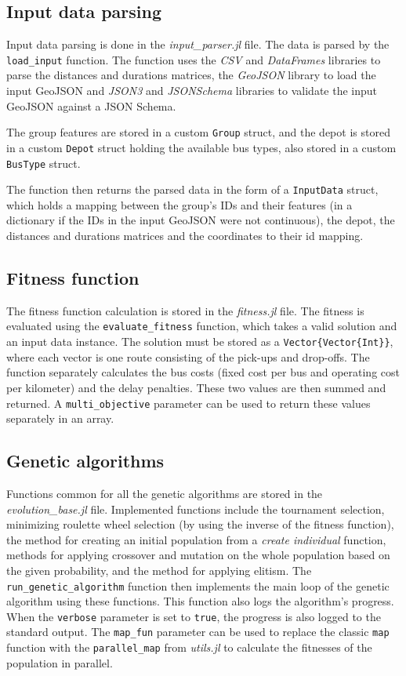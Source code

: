 \subsection{Input data parsing}

Input data parsing is done in the \textit{input\_parser.jl} file. The data is parsed by the \texttt{load\_input} function. The function uses the \textit{CSV} and \textit{DataFrames} libraries to parse the distances and durations matrices, the \textit{GeoJSON} library to load the input GeoJSON and \textit{JSON3} and \textit{JSONSchema} libraries to validate the input GeoJSON against a JSON Schema.

The group features are stored in a custom \texttt{Group} struct, and the depot is stored in a custom \texttt{Depot} struct holding the available bus types, also stored in a custom \texttt{BusType} struct.

The function then returns the parsed data in the form of a \texttt{InputData} struct, which holds a mapping between the group's IDs and their features (in a dictionary if the IDs in the input GeoJSON were not continuous), the depot, the distances and durations matrices and the coordinates to their id mapping.

\subsection{Fitness function}

The fitness function calculation is stored in the \textit{fitness.jl} file. The fitness is evaluated using the \texttt{evaluate\_fitness} function, which takes a valid solution and an input data instance. The solution must be stored as a \texttt{Vector\{Vector\{Int\}\}}, where each vector is one route consisting of the pick-ups and drop-offs. The function separately calculates the bus costs (fixed cost per bus and operating cost per kilometer) and the delay penalties. These two values are then summed and returned. A \texttt{multi\_objective} parameter can be used to return these values separately in an array.

\subsection{Genetic algorithms}

Functions common for all the genetic algorithms are stored in the \textit{evolution\_base.jl} file. Implemented functions include the tournament selection, minimizing roulette wheel selection (by using the inverse of the fitness function), the method for creating an initial population from a \textit{create individual} function, methods for applying crossover and mutation on the whole population based on the given probability, and the method for applying elitism. The \texttt{run\_genetic\_algorithm} function then implements the main loop of the genetic algorithm using these functions. This function also logs the algorithm's progress. When the \texttt{verbose} parameter is set to \texttt{true}, the progress is also logged to the standard output. The \texttt{map\_fun} parameter can be used to replace the classic \texttt{map} function with the \texttt{parallel\_map} from \textit{utils.jl} to calculate the fitnesses of the population in parallel. 

